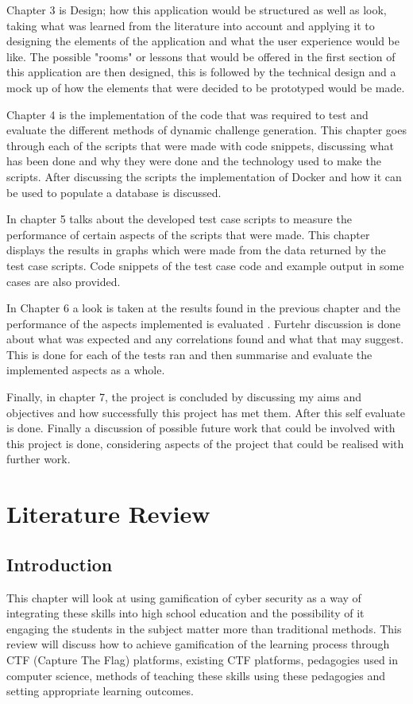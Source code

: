 \documentclass[12pt,a4paper]{article}
\begin{document}
Chapter 3 is Design; how this application would be structured as well as look, taking what was learned from the literature into account and applying it to designing the elements of the application and what the user experience would be like. The possible "rooms" or lessons that would be offered in the first section of this application are then designed, this is followed by the technical design and a mock up of how the elements that were decided to be prototyped would be made.  

Chapter 4 is the implementation of the code that was required to test and evaluate the different methods of dynamic challenge generation. This chapter goes through each of the scripts that were made with code snippets, discussing what has been done and why they were done and the technology used to make the scripts. After discussing the scripts the implementation of Docker and how it can be used to populate a database is discussed.  

In chapter 5 talks about the developed test case scripts to measure the performance of certain aspects of the scripts that were made. This chapter displays the results in graphs which were made from the data returned by the test case scripts. Code snippets of the test case code and example output in some cases are also provided. 

In Chapter 6  a look is taken at the results found in the previous chapter and the performance of the aspects implemented is evaluated . Furtehr discussion is done about what was expected and any correlations found and what that may suggest. This is done for each of the tests ran and then summarise and evaluate the implemented aspects as a whole. 

Finally, in chapter 7, the project is concluded by discussing my aims and objectives and how successfully this project has met them. After this self evaluate is done. Finally a discussion of possible future work that could be involved with this project is done, considering aspects of the project that could be realised with further work.


\newpage

\section{Literature Review}
\subsection{Introduction}
This chapter will look at using gamification of cyber security as a way of integrating these skills into high school education and the possibility of it engaging the students in the subject matter more than traditional methods. This review will discuss how to achieve gamification of the learning process through CTF (Capture The Flag) platforms, existing CTF platforms, pedagogies used in computer science, methods of teaching these skills using these pedagogies and setting appropriate learning outcomes.  
\end{document}
